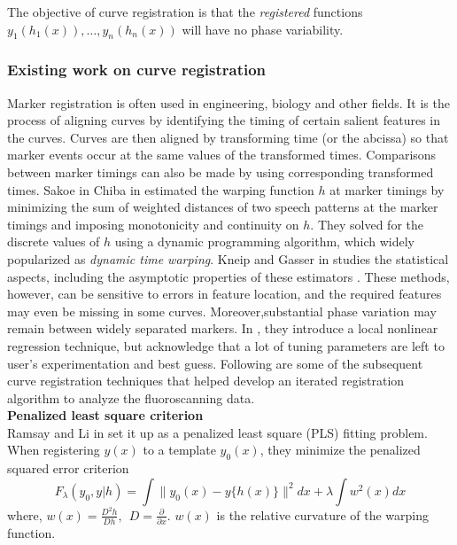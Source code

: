 The objective of curve registration is that the {\emph{registered}} functions $y_1(h_1(x)), \dots, y_n(h_n(x))$ will have no phase variability. \\

\subsubsection*{Existing work on curve registration} \label{Sec7_registration}
Marker registration is often used in engineering, biology and other fields. It is the process of aligning curves by identifying the timing of certain salient features in the curves. Curves are then aligned by transforming time (or the abcissa) so that marker events occur at the same values of the transformed times. Comparisons between marker timings can also be made by using corresponding transformed times. Sakoe in Chiba in \cite{Sakoe_Chiba_1978_IEEE} estimated the warping function $h$ at marker timings by minimizing the sum of weighted distances of two speech patterns at the marker timings and imposing monotonicity and continuity on $h$. They solved for the discrete values of $h$ using a dynamic programming algorithm, which widely popularized as {\emph{dynamic time warping}}. Kneip and Gasser in \cite{Kneip_Gasser_1992_AnnStat} studies the statistical aspects, including the asymptotic properties of these estimators \cite{Kneip_etal_2000_CJS}. These methods, however, can be sensitive to errors in feature location, and the  required features may even be missing in some curves. Moreover,substantial phase variation may remain between widely separated markers. In \cite{Kneip_etal_2000_CJS}, they introduce a local nonlinear regression technique, but acknowledge that a lot of tuning parameters are left to user's experimentation and best guess. Following are some of the subsequent curve registration techniques that helped develop an iterated registration algorithm to analyze the fluoroscanning data. \\

\noindent
{\bf{Penalized least square criterion}} \\
Ramsay and Li in \cite{Ramsay_Li_1998_JRSSB} set it up as a penalized least square (PLS) fitting problem. When registering $y(x)$ to a template $y_0(x)$, they minimize the penalized squared error criterion
\[ F_{\lambda}(y_0, y|h) = \displaystyle \int \| y_0(x) - y\{h(x)\} \|^2 dx + \lambda \displaystyle \int w^2(x)dx\]
where, $w(x) = \frac{D^2h}{Dh},\ \ D = \frac{\partial}{\partial x}$. $w(x)$ is the relative curvature of the warping function.\\

